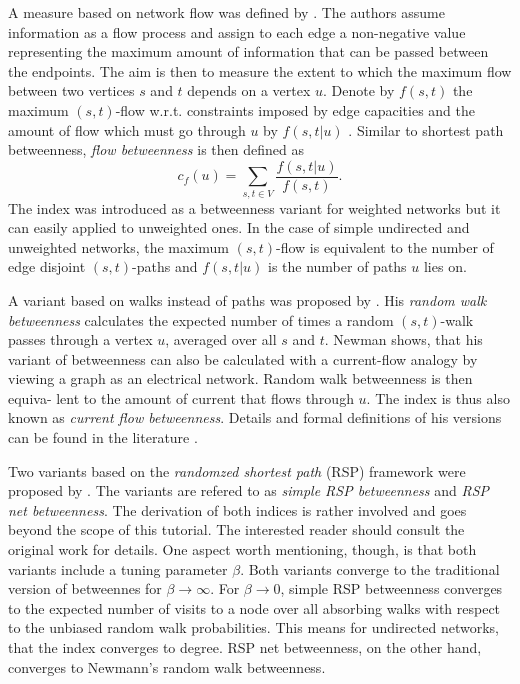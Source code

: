 \documentclass[]{book}
\theoremstyle{definition}
\theoremstyle{definition}
\theoremstyle{definition}
\theoremstyle{remark}
\begin{document}
A measure based on network flow was defined by \citet{fbw-cvgmbbnf-91}.
The authors assume information as a flow process and assign to each edge
a non-negative value representing the maximum amount of information that
can be passed between the endpoints. The aim is then to measure the
extent to which the maximum flow between two vertices \(s\) and \(t\)
depends on a vertex \(u\). Denote by \(f(s,t)\) the maximum
\((s,t)\)-flow w.r.t. constraints imposed by edge capacities and the
amount of flow which must go through \(u\) by \(f( s, t \lvert u )\) .
Similar to shortest path betweenness, \emph{flow betweenness} is then
defined as \[
c_f(u)=\sum\limits_{s,t \in V} \frac{f(s,t\lvert u)}{f(s,t)}.
\] The index was introduced as a betweenness variant for weighted
networks but it can easily applied to unweighted ones. In the case of
simple undirected and unweighted networks, the maximum \((s, t)\)-flow
is equivalent to the number of edge disjoint \((s,t)\)-paths and
\(f(s,t|u)\) is the number of paths \(u\) lies on.

A variant based on walks instead of paths was proposed by
\citet{n-mbcbrw-05}. His \emph{random walk betweenness} calculates the
expected number of times a random \((s,t)\)-walk passes through a vertex
\(u\), averaged over all \(s\) and \(t\). Newman shows, that his variant
of betweenness can also be calculated with a current-flow analogy by
viewing a graph as an electrical network. Random walk betweenness is
then equiva- lent to the amount of current that flows through \(u\). The
index is thus also known as \emph{current flow betweenness}. Details and
formal definitions of his versions can be found in the literature
\citep{n-mbcbrw-05, bf-cmbcf-05}.

Two variants based on the \emph{randomzed shortest path} (RSP) framework
\citep{ysms-fdmngbscd-08, safy-rsptrm-09, kss-dtrspcgnd-14} were
proposed by \citet{klss-tbcmbrsp-16}. The variants are refered to as
\emph{simple RSP betweenness} and \emph{RSP net betweenness}. The
derivation of both indices is rather involved and goes beyond the scope
of this tutorial. The interested reader should consult the original work
for details. One aspect worth mentioning, though, is that both variants
include a tuning parameter \(\beta\). Both variants converge to the
traditional version of betweennes for \(\beta \to \infty\). For
\(\beta \to 0\), simple RSP betweenness converges to the expected number
of visits to a node over all absorbing walks with respect to the
unbiased random walk probabilities. This means for undirected networks,
that the index converges to degree. RSP net betweenness, on the other
hand, converges to Newmann's random walk betweenness.
\end{document}
